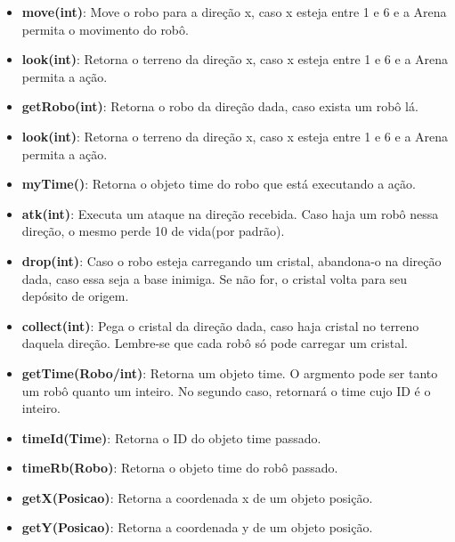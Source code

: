 \documentclass[11pt]{article}
\begin{document}
\begin{itemize}

	\item \textbf{move(int)}: Move o robo para a direção x, caso x esteja entre 1 e 6 e a Arena permita o movimento do robô.

	\item \textbf{look(int)}: Retorna o terreno da direção x, caso x esteja entre 1 e 6 e a Arena permita a ação.
    
    \item \textbf{getRobo(int)}: Retorna o robo da direção dada, caso exista um robô lá.
    
    \item \textbf{look(int)}: Retorna o terreno da direção x, caso x esteja entre 1 e 6 e a Arena permita a ação.
    
    \item \textbf{myTime()}: Retorna o objeto time do robo que está executando a ação.
    
    \item \textbf{atk(int)}: Executa um ataque na direção recebida. Caso haja um robô nessa direção, o mesmo perde 10 de vida(por padrão).
    
    \item \textbf{drop(int)}: Caso o robo esteja carregando um cristal, abandona-o na direção dada, caso essa seja a base inimiga. Se não for, o cristal volta para seu depósito de origem. 
    
    \item \textbf{collect(int)}: Pega o cristal da direção dada, caso haja cristal no terreno daquela direção. Lembre-se que cada robô só pode carregar um cristal.
    
    \item \textbf{getTime(Robo/int)}: Retorna um objeto time. O argmento pode ser tanto um robô quanto um inteiro. No segundo caso, retornará o time cujo ID é o inteiro.
    
    \item \textbf{timeId(Time)}: Retorna o ID do objeto time passado.
    
    \item \textbf{timeRb(Robo)}: Retorna o objeto time do robô passado.
    
    \item \textbf{getX(Posicao)}: Retorna a coordenada x de um objeto posição.
	
    \item \textbf{getY(Posicao)}: Retorna a coordenada y de um objeto posição.
    

\end{itemize}
\end{document}
